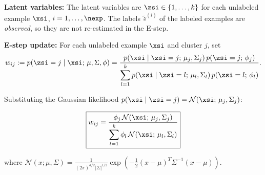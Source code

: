 \begin{answer}
\textbf{Latent variables:} The latent variables are $\zsi \in \{1,\ldots,k\}$ for each unlabeled example $\xsi$, $i = 1,\ldots,\nexp$. The labels $\tilde{z}^{(i)}$ of the labeled examples are \emph{observed}, so they are not re-estimated in the E-step.

\textbf{E-step update:} For each unlabeled example $\xsi$ and cluster $j$, set
$$w_{ij} := p(\zsi = j \mid \xsi;\, \mu, \Sigma, \phi)
= \frac{p(\xsi \mid \zsi = j;\, \mu_j, \Sigma_j)\, p(\zsi = j;\, \phi_j)}{\displaystyle\sum_{l=1}^k p(\xsi \mid \zsi = l;\, \mu_l, \Sigma_l)\, p(\zsi = l;\, \phi_l)}.$$

Substituting the Gaussian likelihood $p(\xsi \mid \zsi = j) = \mathcal{N}(\xsi;\, \mu_j, \Sigma_j)$:

$$\boxed{w_{ij} = \frac{\phi_j \,\mathcal{N}(\xsi;\,\mu_j,\Sigma_j)}{\displaystyle\sum_{l=1}^k \phi_l\, \mathcal{N}(\xsi;\,\mu_l,\Sigma_l)}}$$

where $\mathcal{N}(x;\mu,\Sigma) = \frac{1}{(2\pi)^{d/2}|\Sigma|^{1/2}}\exp\!\left(-\tfrac{1}{2}(x-\mu)^T\Sigma^{-1}(x-\mu)\right)$.
\end{answer}
